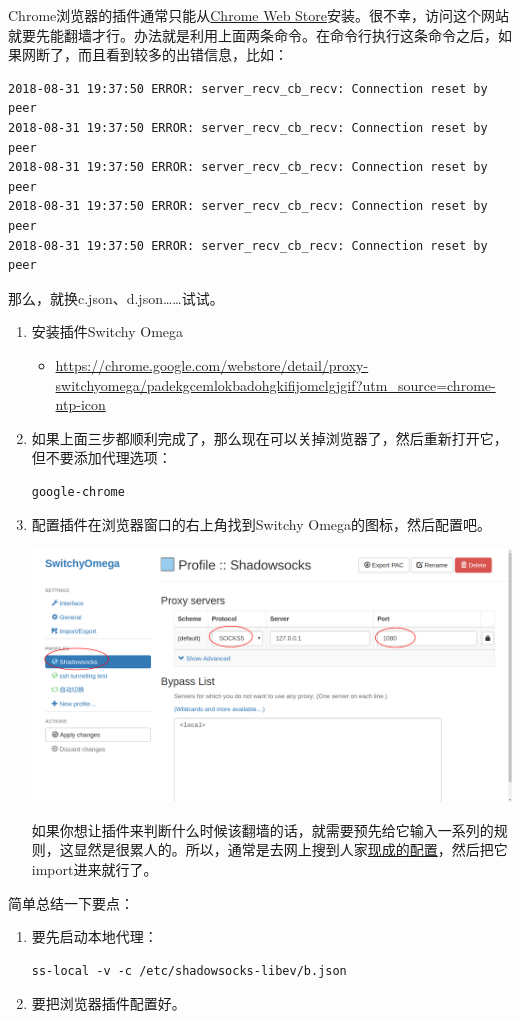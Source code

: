 \documentclass{wx672ctexart}
\begin{document}
Chrome浏览器的插件通常只能从\href{https://chrome.google.com/webstore/category/extensions?utm\_source=chrome-ntp-icon}{Chrome Web Store}安装。很不幸，访问这个网站就要先能翻墙才行。办法就是利用上面两条命令。在命令行执行这条命令之后，如果网断了，而且看到较多的出错信息，比如：
\begin{verbatim}
2018-08-31 19:37:50 ERROR: server_recv_cb_recv: Connection reset by peer
2018-08-31 19:37:50 ERROR: server_recv_cb_recv: Connection reset by peer
2018-08-31 19:37:50 ERROR: server_recv_cb_recv: Connection reset by peer
2018-08-31 19:37:50 ERROR: server_recv_cb_recv: Connection reset by peer
2018-08-31 19:37:50 ERROR: server_recv_cb_recv: Connection reset by peer
\end{verbatim}
那么，就换c.json、d.json……试试。

\begin{enumerate}
\item 安装插件Switchy Omega
\begin{itemize}
\item \url{https://chrome.google.com/webstore/detail/proxy-switchyomega/padekgcemlokbadohgkifijomclgjgif?utm\_source=chrome-ntp-icon}
\end{itemize}
\item 如果上面三步都顺利完成了，那么现在可以关掉浏览器了，然后重新打开它，但不要添加代理选项：
\begin{verbatim}
google-chrome
\end{verbatim}
\item 配置插件在浏览器窗口的右上角找到Switchy Omega的图标，然后配置吧。

\begin{center}
\includegraphics[width=.6\linewidth]{./switchyomega1.png}
\end{center}

如果你想让插件来判断什么时候该翻墙的话，就需要预先给它输入一系列的规则，这显然是很累人的。所以，通常是去网上搜到人家\href{https://github.com/shminer/SwitchyOmega-backup}{现成的配置}，然后把它import进来就行了。
\end{enumerate}

简单总结一下要点：
\begin{enumerate}
\item 要先启动本地代理：
\begin{verbatim}
ss-local -v -c /etc/shadowsocks-libev/b.json
\end{verbatim}
\item 要把浏览器插件配置好。
\end{enumerate}
\end{document}

